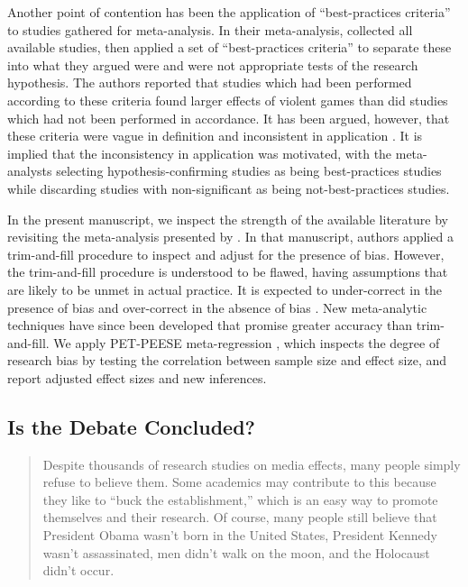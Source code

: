\documentclass[man]{apa6}
\begin{document}
Another point of contention has been the application of ``best-practices criteria'' to studies gathered for meta-analysis. In their meta-analysis, \citet{Anderson:etal:2010} collected all available studies, then applied a set of ``best-practices criteria'' to separate these into what they argued were and were not appropriate tests of the research hypothesis. The authors reported that studies which had been performed according to these criteria found larger effects of violent games than did studies which had not been performed in accordance. It has been argued, however, that these criteria were vague in definition and inconsistent in application \citep{Elson:Ferguson:2014,Ferguson:Kilburn:2010}. 
It is implied that the inconsistency in application was motivated, with the meta-analysts selecting hypothesis-confirming studies as being best-practices studies while discarding studies with non-significant as being not-best-practices studies.

In the present manuscript, we inspect the strength of the available literature by revisiting the meta-analysis presented by \citet{Anderson:etal:2010}. In that manuscript, authors applied a trim-and-fill procedure \citep{Duval:Tweedie:2000} to inspect and adjust for the presence of bias. 
However, the trim-and-fill procedure is understood to be flawed, having assumptions that are likely to be unmet in actual practice. It is expected to under-correct in the presence of bias and over-correct in the absence of bias \citep{Peters:etal:2007,Simonsohn:DATACOLADAPOST}.
New meta-analytic techniques have since been developed that promise greater accuracy than trim-and-fill. We apply PET-PEESE meta-regression \citep{Stanley:Doucouliagos:2014}, which inspects the degree of research bias by testing the correlation between sample size and effect size, and report adjusted effect sizes and new inferences.

\subsection{Is the Debate Concluded?}
\begin{quote}
Despite thousands of research studies on media effects, many people simply refuse to believe them. Some academics may contribute to this because they like to ``buck the establishment,'' which is an easy way to promote themselves and their research. Of course, many people still believe that President Obama wasn't born in the United States, President Kennedy wasn't assassinated, men didn't walk on the moon, and the Holocaust didn't occur. \citep[p. 572]{Strasburger:etal:2014}
\end{quote}
\end{document}
